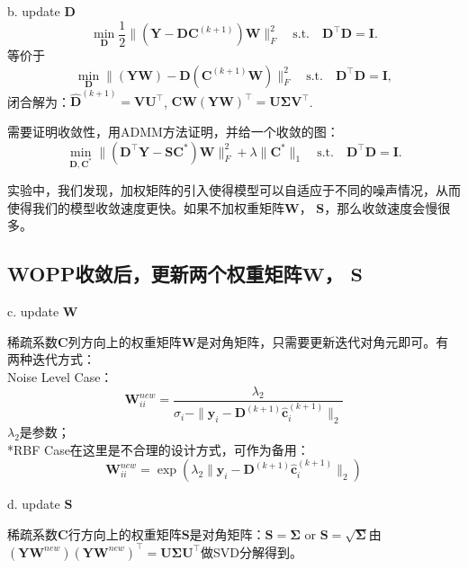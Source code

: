 \documentclass[10pt,twocolumn,letterpaper]{article}
\begin{document}
b. update $\mathbf{D}$
\begin{equation}
\min_{\mathbf{D}}\frac{1}{2}\|(\mathbf{Y}-\mathbf{D}\mathbf{C}^{(k+1)})\mathbf{W}\|_{F}^{2}
\quad
\text{s.t.}
\quad
\mathbf{D}^{\top}\mathbf{D} =\mathbf{I}. 
\end{equation}
等价于
\begin{equation}
\min_{\mathbf{D}}\|(\mathbf{Y}\mathbf{W})-\mathbf{D}(\mathbf{C}^{(k+1)}\mathbf{W})\|_{F}^{2}
\quad
\text{s.t.}
\quad
\mathbf{D}^{\top}\mathbf{D} = \mathbf{I},
\end{equation}
闭合解为：$\hat{\mathbf{D}}^{(k+1)}=\mathbf{V}\mathbf{U}^{\top}$, $\mathbf{C}\mathbf{W}(\mathbf{Y}\mathbf{W})^{\top}=\mathbf{U}\mathbf{\Sigma}\mathbf{V}^{\top}$.

需要证明收敛性，用ADMM方法证明，并给一个收敛的图：
\begin{equation}
\min_{\mathbf{D},\mathbf{C}^{*}}\|(\mathbf{D}^{\top}\mathbf{Y}-\mathbf{S}\mathbf{C}^{*})\mathbf{W}\|_{F}^{2} 
+
\lambda\|\mathbf{C}^{*}\|_{1}
\quad
\text{s.t.}
\quad
\mathbf{D}^{\top}\mathbf{D} = \mathbf{I}.
\end{equation}

实验中，我们发现，加权矩阵的引入使得模型可以自适应于不同的噪声情况，从而使得我们的模型收敛速度更快。如果不加权重矩阵$\mathbf{W}$， $\mathbf{S}$，那么收敛速度会慢很多。

\subsection{WOPP收敛后，更新两个权重矩阵$\mathbf{W}$， $\mathbf{S}$}
c. update $\mathbf{W}$

稀疏系数$\mathbf{C}$列方向上的权重矩阵$\mathbf{W}$是对角矩阵，只需要更新迭代对角元即可。有两种迭代方式：
\\
Noise Level Case：
\begin{equation}
\mathbf{W}_{ii}^{new}=\frac{\lambda_{2}}{\sigma_{i}-\|\mathbf{y}_{i}-\mathbf{D}^{(k+1)}\hat{\mathbf{c}}_{i}^{(k+1)}\|_{2}}
\end{equation}
$\lambda_{2}$是参数；
\\
*RBF Case在这里是不合理的设计方式，可作为备用：
\begin{equation}
\mathbf{W}_{ii}^{new}=\exp(\lambda_{2}\|\mathbf{y}_{i}-\mathbf{D}^{(k+1)}\hat{\mathbf{c}}_{i}^{(k+1)}\|_{2})
\end{equation}

d. update $\mathbf{S}$

稀疏系数$\mathbf{C}$行方向上的权重矩阵$\mathbf{S}$是对角矩阵：$\mathbf{S}=\mathbf{\Sigma}$ or $\mathbf{S}=\sqrt{\mathbf{\Sigma}}$由$(\mathbf{Y}\mathbf{W}^{new})(\mathbf{Y}\mathbf{W}^{new})^{\top}=\mathbf{U}\mathbf{\Sigma}\mathbf{U}^{\top}$做SVD分解得到。






{\small


}
\end{document}
